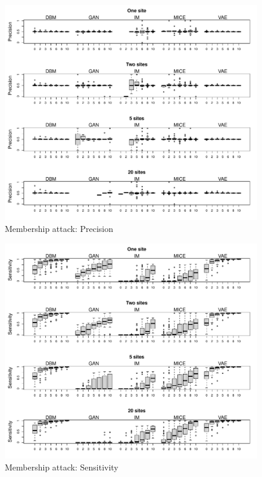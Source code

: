 \documentclass[12pt]{article}
\begin{document}
    \begin{figure}[h]
   \centering
   \includegraphics[scale=0.7]{images/membership_precision.pdf}
   \caption{Membership attack: Precision}
 \end{figure}
 

 
   \begin{figure}[h]
   \centering
   \includegraphics[scale=0.7]{images/membership_sensitivity.pdf}
   \caption{Membership attack: Sensitivity}
 \end{figure}
 
\end{document}
